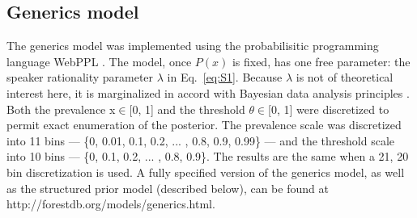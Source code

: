 \documentclass[10pt,letterpaper]{article}
\begin{document}
\subsection{Generics model}
The generics model was implemented using the probabilisitic programming language WebPPL \cite{dippl}. 
The model, once $P(x)$ is fixed, has one free parameter: the speaker rationality parameter $\lambda$ in Eq.~\ref{eq:S1}. 
Because $\lambda$ is not of theoretical interest here, it is marginalized in accord with Bayesian data analysis principles \cite{LW2014}.
Both the prevalence  x$\in$[0, 1]  and the threshold  $\theta \in$[0, 1] were discretized to permit exact enumeration of the posterior.
The prevalence scale was discretized into 11 bins --- \{0, 0.01, 0.1, 0.2, ... , 0.8, 0.9, 0.99\} --- and the threshold scale into 10 bins ---  \{0, 0.1, 0.2, ... , 0.8, 0.9\}. 
The results are the same when a 21, 20 bin discretization is used. 
A fully specified version of the generics model, as well as the structured prior model (described below), can be found at http://forestdb.org/models/generics.html. 
\end{document}
